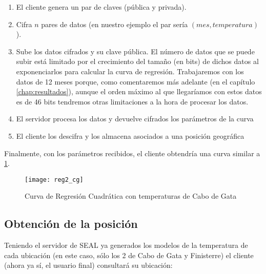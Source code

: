 \begin{enumerate}
    \item El cliente genera un par de claves (pública y privada).

    \item Cifra $n$ pares de datos (en nuestro ejemplo el par sería $(mes, temperatura)$).

    \item Sube los datos cifrados y su clave pública. El número de datos que se puede subir está limitado por el crecimiento del tamaño (en bits) de dichos datos al exponenciarlos para calcular la curva de regresión. Trabajaremos con los datos de 12 meses porque, como comentaremos más adelante (en el capítulo \ref{chap:resultados}), aunque el orden máximo al que llegaríamos con estos datos es de 46 bits tendremos otras limitaciones a la hora de procesar los datos.

    \item El servidor procesa los datos y devuelve cifrados los parámetros de la curva

    \item El cliente los descifra y los almacena asociados a una posición geográfica
\end{enumerate}

Finalmente, con los parámetros recibidos, el cliente obtendría una curva similar a \ref{fig:reg2_cg}.

\begin{figure}[h]
    \centering
    \texttt{[image: reg2\_cg]}
    \caption{Curva de Regresión Cuadrática con temperaturas de Cabo de Gata}
    \label{fig:reg2_cg}
\end{figure}

\subsection{Obtención de la posición}

Teniendo el servidor de SEAL ya generados los modelos de la temperatura de cada ubicación (en este caso, sólo los 2 de Cabo de Gata y Finisterre) el cliente (ahora ya sí, el usuario final) consultará su ubicación:

